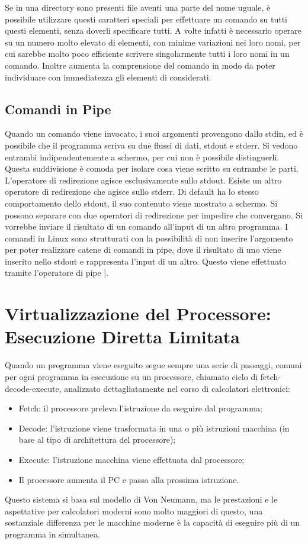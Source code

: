 \documentclass{article}
\numberwithin{equation}{subsection}
\begin{document}
Se in una directory sono presenti file aventi una parte del nome uguale, è possibile utilizzare questi caratteri speciali per effettuare un comando su tutti questi elementi, senza doverli specificare tutti. A 
volte infatti è necessario operare su un numero molto elevato di elementi, con minime variazioni nei loro nomi, per cui sarebbe molto poco efficiente scrivere singolarmente tutti i loro nomi in un comando. 
Inoltre aumenta la comprensione del comando in modo da poter individuare con immediatezza gli elementi di considerati. 

\subsection{Comandi in Pipe}

Quando un comando viene invocato, i suoi argomenti provengono dallo stdin, ed è possibile che il programma scriva su due flussi di dati, stdout e stderr. Si vedono entrambi indipendentemente a schermo, per cui 
non è possibile distinguerli. Questa suddivisione è comoda per isolare cosa viene scritto su entrambe le parti. L'operatore di redirezione agisce esclusivamente sullo stdout. Esiste un altro operatore di 
redirezione che agisce sullo stderr. Di default ha lo stesso comportamento dello stdout, il suo contenuto viene mostrato a schermo. Si possono separare con due operatori di redirezione per impedire che 
convergano. 
Si vorrebbe inviare il risultato di un comando all'input di un altro programma. I comandi in Linux sono strutturati con la possibilità di non inserire l'argomento per poter realizzare catene di comandi in pipe, 
dove il risultato di uno viene inserito nello stdout e rappresenta l'input di un altro. Questo viene effettuato tramite l'operatore di pipe \verb|||. 


\clearpage

\section{Virtualizzazione del Processore: Esecuzione Diretta Limitata}
\label{sec:edl}
Quando un programma viene eseguito segue sempre una serie di passaggi, comuni per ogni programma in esecuzione su un processore, chiamato ciclo di fetch-decode-execute, 
analizzato dettagliatamente nel corso di calcolatori elettronici:
\begin{itemize}
  \item Fetch: il processore preleva l'istruzione da eseguire dal programma;
  \item Decode: l'istruzione viene trasformata in una o più istruzioni macchina (in base al tipo di architettura del processore);
  \item Execute: l'istruzione macchina viene effettuata dal processore;
  \item Il processore aumenta il PC e passa alla prossima istruzione. 
\end{itemize}
Questo sistema si basa sul modello di Von Neumann, ma le prestazioni e le aspettative per calcolatori 
moderni sono molto maggiori di questo, una sostanziale differenza per le macchine moderne è la capacità di eseguire più di un programma in simultanea. 
\end{document}
